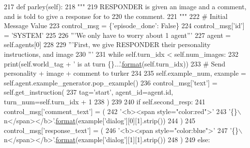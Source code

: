\begin{DoxyCode}
217     \textcolor{keyword}{def }parley(self):
218         \textcolor{stringliteral}{"""}
219 \textcolor{stringliteral}{        RESPONDER is given an image and a comment, and is told to give a response for to}
220 \textcolor{stringliteral}{        the comment.}
221 \textcolor{stringliteral}{        """}
222         \textcolor{comment}{# Initial Message Value}
223         control\_msg = \{\textcolor{stringliteral}{'episode\_done'}: \textcolor{keyword}{False}\}
224         control\_msg[\textcolor{stringliteral}{'id'}] = \textcolor{stringliteral}{'SYSTEM'}
225 
226         \textcolor{stringliteral}{'''We only have to worry about 1 agent'''}
227         agent = self.agents[0]
228 
229         \textcolor{stringliteral}{'''First, we give RESPONDER their personality instructions, and image}
230 \textcolor{stringliteral}{        '''}
231         \textcolor{keywordflow}{while} self.turn\_idx < self.num\_images:
232             print(self.world\_tag + \textcolor{stringliteral}{' is at turn \{\}...'}.\hyperlink{namespaceparlai_1_1chat__service_1_1services_1_1messenger_1_1shared__utils_a32e2e2022b824fbaf80c747160b52a76}{format}(self.turn\_idx))
233             \textcolor{comment}{# Send personality + image + comment to turker}
234 
235             self.example\_num, example = self.agent.example\_generator.pop\_example()
236             control\_msg[\textcolor{stringliteral}{'text'}] = self.get\_instruction(
237                 tag=\textcolor{stringliteral}{'start'}, agent\_id=agent.id, turn\_num=self.turn\_idx + 1
238             )
239 
240             \textcolor{keywordflow}{if} self.second\_resp:
241                 control\_msg[\textcolor{stringliteral}{'comment\_text'}] = (
242                     \textcolor{stringliteral}{'<b><span style="color:red">'}
243                     \textcolor{stringliteral}{'\{\}\(\backslash\)n</span></b>'}.\hyperlink{namespaceparlai_1_1chat__service_1_1services_1_1messenger_1_1shared__utils_a32e2e2022b824fbaf80c747160b52a76}{format}(example[\textcolor{stringliteral}{'dialog'}][0][1].strip())
244                 )
245                 control\_msg[\textcolor{stringliteral}{'response\_text'}] = (
246                     \textcolor{stringliteral}{'<b><span style="color:blue">'}
247                     \textcolor{stringliteral}{'\{\}\(\backslash\)n</span></b>'}.\hyperlink{namespaceparlai_1_1chat__service_1_1services_1_1messenger_1_1shared__utils_a32e2e2022b824fbaf80c747160b52a76}{format}(example[\textcolor{stringliteral}{'dialog'}][1][1].strip())
248                 )
249             \textcolor{keywordflow}{else}:

\end{DoxyCode}
